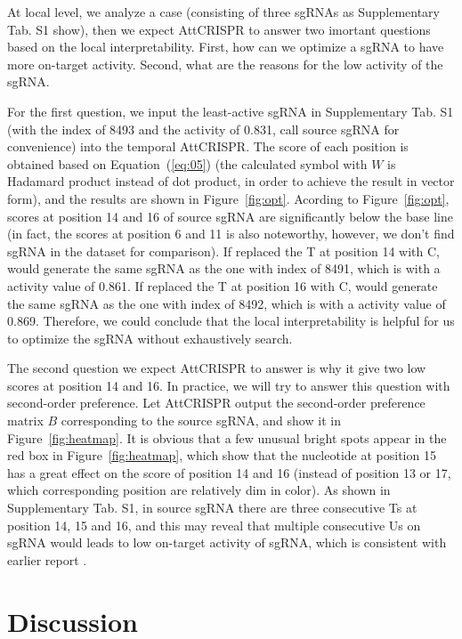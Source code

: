 \documentclass{bioinfo}
\begin{document}
At local level, we analyze a case (consisting of three sgRNAs as Supplementary Tab. S1 show), 
then we expect AttCRISPR to answer two imortant questions based on the local interpretability. 
First, how can we optimize a sgRNA to have more on-target activity. 
Second, what are the reasons for the low activity of the sgRNA. 

For the first question, we input the least-active sgRNA in Supplementary Tab. S1 (with the index of 8493 and the activity of 0.831, call source sgRNA for convenience) into the temporal AttCRISPR. 
The score of each position is obtained based on Equation~(\ref{eq:05}) (the calculated symbol with $W$ is Hadamard product instead of dot product, in order to achieve the result in vector form), 
and the results are shown in Figure~\ref{fig:opt}. 
Acording to Figure~\ref{fig:opt}, scores at position 14 and 16 of source sgRNA are significantly below the base line 
(in fact, the scores at position 6 and 11 is also noteworthy, however, we don't find sgRNA in the dataset for comparison). 
If replaced the T at position 14 with C, would generate the same sgRNA as the one with index of 8491, which is with a activity value of 0.861. 
If replaced the T at position 16 with C, would generate the same sgRNA as the one with index of 8492, which is with a activity value of 0.869. 
Therefore, we could conclude that the local interpretability is helpful for us to optimize the sgRNA without exhaustively search.

The second question we expect AttCRISPR to answer is why it give two low scores at position 14 and 16. 
In practice, we will try to answer this question with second-order preference. 
Let AttCRISPR output the second-order preference matrix $B$ corresponding to the source sgRNA, and show it in Figure~\ref{fig:heatmap}. 
It is obvious that a few unusual bright spots appear in the red box in Figure~\ref{fig:heatmap}, 
which show that the nucleotide at position 15 has a great effect on the score of position 14 and 16 (instead of position 13 or 17, which corresponding position are relatively dim in color). 
As shown in Supplementary Tab. S1, in source sgRNA there are three consecutive Ts at position 14, 15 and 16, and this may reveal that multiple consecutive Us on sgRNA would leads to low on-target activity of sgRNA, which is consistent with earlier report \citep{wu2014genome-wide}. 

\section{Discussion}
\end{document}
